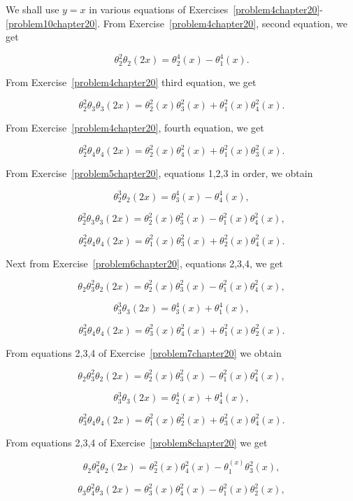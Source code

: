 \begin{solution}
We shall use $y=x$ in various equations of Exercises~\ref{problem4chapter20}-\ref{problem10chapter20}. From Exercise~\ref{problem4chapter20}, second equation, we get

$$\theta_2^2 \theta_2(2x) = \theta_2^4(x) - \theta_1^4(x).$$

From Exercise~\ref{problem4chapter20} third equation, we get

$$\theta_2^2 \theta_3 \theta_3(2x) = \theta_2^2(x) \theta_3^2(x) + \theta_1^2(x) \theta_4^2(x).$$

From Exercise~\ref{problem4chapter20}, fourth equation, we get

$$\theta_2^2 \theta_4 \theta_4(2x) = \theta_2^2(x) \theta_4^2(x) + \theta_1^2(x) \theta_3^2(x).$$

From Exercise~\ref{problem5chapter20}, equations 1,2,3 in order, we obtain

$$\theta_2^3 \theta_2(2x) = \theta_3^4(x) - \theta_4^4(x),$$

$$\theta_2^2\theta_3\theta_3(2x) = \theta_2^2(x) \theta_3^2(x) - \theta_1^2(x) \theta_4^2(x),$$

$$\theta_2^2 \theta_4 \theta_4(2x) = \theta_1^2(x) \theta_3^2(x) + \theta_2^2(x) \theta_4^2(x).$$

Next from Exercise~\ref{problem6chapter20}, equations 2,3,4, we get

$$\theta_2\theta_3^2\theta_2(2x) = \theta_2^2(x) \theta_3^2(x) - \theta_1^2(x) \theta_4^2(x),$$

$$\theta_3^3\theta_3(2x) = \theta_3^4(x) + \theta_1^4(x),$$

$$\theta_3^2 \theta_4 \theta_4(2x) = \theta_3^2(x) \theta_4^2(x) + \theta_1^2(x) \theta_2^2(x).$$

From equations 2,3,4 of Exercise~\ref{problem7chapter20} we obtain

$$\theta_2\theta_3^2 \theta_2(2x) = \theta_2^2(x) \theta_3^2(x) - \theta_1^2(x) \theta_4^2(x),$$

$$\theta_3^3 \theta_3(2x) = \theta_2^4(x) + \theta_4^4(x),$$

$$\theta_3^2 \theta_4 \theta_4(2x) = \theta_1^2(x) \theta_2^2(x) + \theta_3^2(x) \theta_4^2(x).$$

From equations 2,3,4 of Exercise~\ref{problem8chapter20} we get

$$\theta_2 \theta_4^2 \theta_2(2x) = \theta_2^2(x) \theta_4^2(x) - \theta_1^(x) \theta_3^2(x),$$

$$\theta_3 \theta_4^2 \theta_3(2x) = \theta_3^2(x) \theta_4^2(x) - \theta_1^2(x) \theta_2^2(x),$$


\end{solution}
